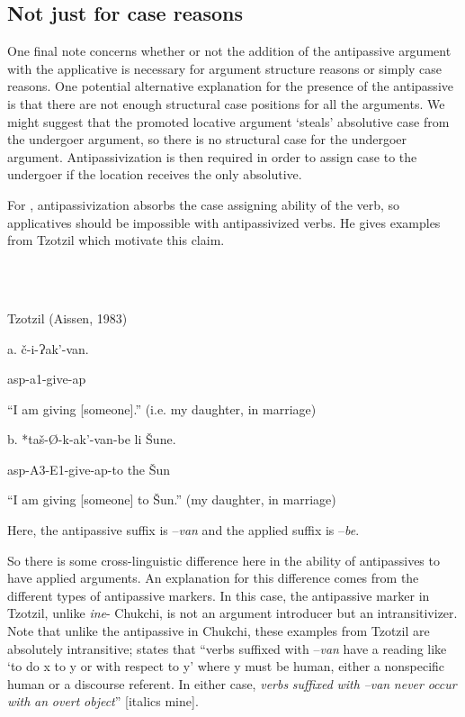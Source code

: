 \documentclass[output=paper,modfonts,nonflat]{langsci/langscibook}
\begin{document}
\subsection{Not just for case reasons} %

One final note concerns whether or not the addition of the antipassive argument with the applicative is necessary for argument structure reasons or simply case reasons.  One potential alternative explanation for the presence of the antipassive is that there are not enough structural case positions for all the arguments.  We might suggest that the promoted locative argument ‘steals’ absolutive case from the undergoer argument, so there is no structural case for the undergoer argument.  Antipassivization is then required in order to assign case to the undergoer if the location receives the only absolutive.  

For \citet{Baker1988}, antipassivization absorbs the case assigning ability of the verb, so applicatives should be impossible with antipassivized verbs.  He gives examples from Tzotzil which motivate this claim.\textstyleEndnoteSymbol{} 

\ea%
    \label{ex:key:15}
    \gll\\
        \\
    \glt
    \z

          Tzotzil (Aissen, 1983)

a.  č-i-Ɂak’-van.

  asp{}-a1{}-give{}-ap

  “I am giving [someone].”    (i.e. my daughter, in marriage)

b.  *taš-Ø-k-ak’-van-be  li  Šune.

  asp{}-A3-E1-give-ap{}-to  the  Šun

  “I am giving [someone] to Šun.”  (my daughter, in marriage)

Here, the antipassive suffix is –\textit{van} and the applied suffix is –\textit{be}.

So there is some cross-linguistic difference here in the ability of antipassives to have applied arguments.  An explanation for this difference comes from the different types of antipassive markers.  In this case, the antipassive marker in Tzotzil, unlike \textit{ine}{}- Chukchi, is not an argument introducer but an intransitivizer.  Note that unlike the antipassive in Chukchi, these examples from Tzotzil are absolutely intransitive; \citet[291]{Aissen1993} states that “verbs suffixed with –\textit{van} have a reading like ‘to do x to y or with respect to y’ where y must be human, either a nonspecific human or a discourse referent.  In either case, \textit{verbs} \textit{suffixed} \textit{with} \textit{–van} \textit{never} \textit{occur} \textit{with} \textit{an} \textit{overt} \textit{object}” [italics mine].
\end{document}
